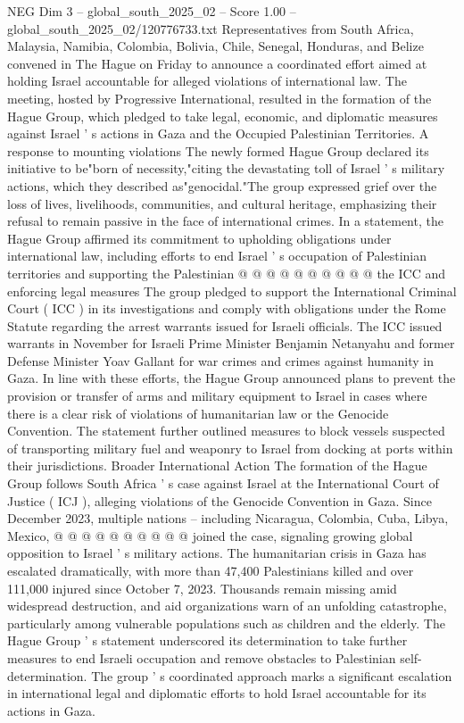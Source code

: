 \begin{textsample}{NEG Dim 3 – global\_south\_2025\_02 – Score 1.00 – global\_south\_2025\_02/120776733.txt}  \label{ex:f3_neg_046}
Representatives from South Africa, Malaysia, Namibia, Colombia, Bolivia, Chile, Senegal, Honduras, and Belize convened in The Hague on Friday to announce a coordinated effort aimed at holding Israel accountable for alleged violations of international law.
The meeting, hosted by Progressive International, resulted in the formation of the Hague Group, which pledged to take legal, economic, and diplomatic measures against Israel ' s actions in Gaza and the Occupied Palestinian Territories.
A response to mounting violations The newly formed Hague Group declared its initiative to be"born of necessity,"citing the devastating toll of Israel ' s military actions, which they described as"genocidal."The group expressed grief over the loss of lives, livelihoods, communities, and cultural heritage, emphasizing their refusal to remain passive in the face of international crimes.
In a statement, the Hague Group affirmed its commitment to upholding obligations under international law, including efforts to end Israel ' s occupation of Palestinian territories and supporting the Palestinian @ @ @ @ @ @ @ @ @ @ the ICC and enforcing legal measures The group pledged to support the International Criminal Court ( ICC ) in its investigations and comply with obligations under the Rome Statute regarding the arrest warrants issued for Israeli officials.
The ICC issued warrants in November for Israeli Prime Minister Benjamin Netanyahu and former Defense Minister Yoav Gallant for war crimes and crimes against humanity in Gaza.
In line with these efforts, the Hague Group announced plans to prevent the provision or transfer of arms and military equipment to Israel in cases where there is a clear risk of violations of humanitarian law or the Genocide Convention.
The statement further outlined measures to block vessels suspected of transporting military fuel and weaponry to Israel from docking at ports within their jurisdictions.
Broader International Action The formation of the Hague Group follows South Africa ' s case against Israel at the International Court of Justice ( ICJ ), alleging violations of the Genocide Convention in Gaza.
Since December 2023, multiple nations -- including Nicaragua, Colombia, Cuba, Libya, Mexico, @ @ @ @ @ @ @ @ @ @ joined the case, signaling growing global opposition to Israel ' s military actions.
The humanitarian crisis in Gaza has escalated dramatically, with more than 47,400 Palestinians killed and over 111,000 injured since October 7, 2023.
Thousands remain missing amid widespread destruction, and aid organizations warn of an unfolding catastrophe, particularly among vulnerable populations such as children and the elderly.
The Hague Group ' s statement underscored its determination to take further measures to end Israeli occupation and remove obstacles to Palestinian self-determination.
The group ' s coordinated approach marks a significant escalation in international legal and diplomatic efforts to hold Israel accountable for its actions in Gaza.

\end{textsample}

